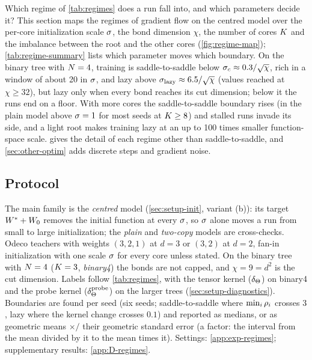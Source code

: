 Which regime of \cref{tab:regimes} does a run fall into, and which parameters decide it? This section maps the
regimes of gradient flow on the centred model over the per-core initialization scale $\sigma$, the bond dimension
$\chi$, the number of cores $K$ and the imbalance between the root and the other cores (\cref{fig:regime-map});
\cref{tab:regime-summary} lists which parameter moves which boundary. On the binary tree with $N=4$,
training is saddle-to-saddle below $\sigma_c\approx0.3/\sqrt\chi$, rich in a window of about 20 in $\sigma$, and lazy
above $\sigma_{\rm lazy}\approx6.5/\sqrt\chi$ (values reached at $\chi\ge32$), but lazy only when every bond reaches
its cut dimension; below it the runs end on a floor. With more cores the saddle-to-saddle boundary rises (in the
plain model above $\sigma=1$ for most seeds at $K\ge8$) and stalled runs invade its side, and a light root makes
training lazy at an up to 100 times smaller function-space scale.  gives the detail of
each regime other than saddle-to-saddle, and \cref{sec:other-optim} adds discrete steps and gradient noise.
 

\subsection{Protocol}\label{sec:regime-protocol}

The main family is the \emph{centred} model (\cref{sec:setup-init}, variant (b)): its target $W^{*}+W_{0}$ removes the
initial function at every $\sigma$, so $\sigma$ alone moves a run from small to large initialization; the
\emph{plain} and \emph{two-copy} models are cross-checks. Odeco teachers with weights $(3,2,1)$ at $d=3$ or $(3,2)$
at $d=2$, fan-in initialization with one scale $\sigma$ for every core unless stated. On the binary tree with $N=4$
($K=3$, \emph{binary4}) the bonds are not capped, and $\chi=9=d^2$ is the cut dimension. Labels follow
\cref{tab:regimes}, with the tensor kernel ($\delta_{\Theta}$) on binary4 and the probe kernel ($\delta_{\Theta}^{\rm probe}$) on the larger
trees (\cref{sec:setup-diagnostics}). Boundaries
are found per seed (six seeds; saddle-to-saddle where $\min_i\rho_{i}$ crosses $3$, lazy where the kernel change
crosses $0.1$) and reported as medians, or as geometric means $\times/$ their geometric standard error (a factor:
the interval from the mean divided by it to the mean times it). Settings: \cref{app:exp-regimes}; supplementary
results: \cref{app:D-regimes}.

